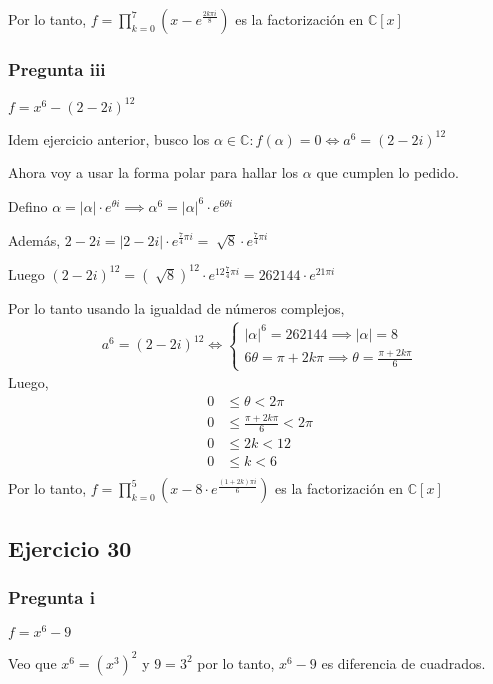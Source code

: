 Por lo tanto, $ f = \prod_{k = 0}^{7}(x-e^{\frac{2k \pi i}{8}}) $ es la factorización en $ \mathbb{C}[x] $

\subsubsection{Pregunta iii}
$ f = x^6 - (2-2i)^{12} $

Idem ejercicio anterior, busco los $ \alpha \in \mathbb{C}: f(\alpha) = 0 \iff a^6 = (2-2i)^{12} $

Ahora voy a usar la forma polar para hallar los $ \alpha $ que cumplen lo pedido.

Defino $ \alpha = |\alpha| \cdot e^{\theta i} \implies \alpha^6 = |\alpha|^6 \cdot e^{6\theta i} $

Además, $ 2-2i = |2-2i| \cdot e^{\frac{7}{4}\pi i} = \sqrt[]{8} \cdot e^{\frac{7}{4}\pi i} $

Luego $ (2-2i)^{12} = (\sqrt[]{8})^{12} \cdot e^{12\frac{7}{4}\pi i} = 262144 \cdot e^{21\pi i} $

Por lo tanto usando la igualdad de números complejos,
\begin{align*}
    a^6 = (2-2i)^{12} \iff \begin{cases}
        |\alpha|^6 = 262144 \implies |\alpha| = 8 \\
        6\theta = \pi + 2k \pi \implies \theta = \frac{\pi +2k \pi}{6}
    \end{cases}
\end{align*}
Luego,
\begin{align*}
    0 &\leq \theta < 2\pi \\
    0 &\leq \frac{\pi +2k \pi}{6} < 2\pi \\
    0 &\leq 2k < 12 \\
    0 &\leq k < 6 \\
\end{align*}
Por lo tanto,
$ f = \prod_{k = 0}^{5}(x-8\cdot e^{\frac{(1+2k)\pi i}{6}}) $ es la factorización en $ \mathbb{C}[x] $

\subsection{Ejercicio 30}

\subsubsection{Pregunta i}
$ f = x^6 - 9 $

Veo que $ x^6 = (x^3)^2 $ y $ 9 = 3^2 $ por lo tanto, $ x^6 - 9 $ es diferencia de cuadrados.

